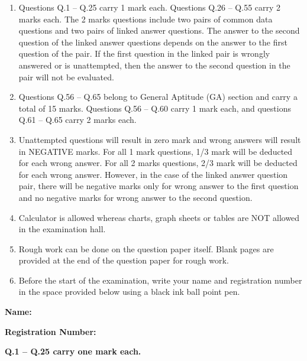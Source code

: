 \documentclass[journal,12pt,onecolumn]{IEEEtran}
\begin{document}
\begin{enumerate}
    \item Questions Q.1 -- Q.25 carry 1 mark each. Questions Q.26 -- Q.55 carry 2 marks each. The 2 marks questions include two pairs of common data questions and two pairs of linked answer questions. The answer to the second question of the linked answer questions depends on the answer to the first question of the pair. If the first question in the linked pair is wrongly answered or is unattempted, then the answer to the second question in the pair will not be evaluated.

    \item Questions Q.56 -- Q.65 belong to General Aptitude (GA) section and carry a total of 15 marks. Questions Q.56 -- Q.60 carry 1 mark each, and questions Q.61 -- Q.65 carry 2 marks each.

    \item Unattempted questions will result in zero mark and wrong answers will result in NEGATIVE marks. For all 1 mark questions, 1/3 mark will be deducted for each wrong answer. For all 2 marks questions, 2/3 mark will be deducted for each wrong answer. However, in the case of the linked answer question pair, there will be negative marks only for wrong answer to the first question and no negative marks for wrong answer to the second question.

    \item Calculator is allowed whereas charts, graph sheets or tables are NOT allowed in the examination hall.

    \item Rough work can be done on the question paper itself. Blank pages are provided at the end of the question paper for rough work.

    \item Before the start of the examination, write your name and registration number in the space provided below using a black ink ball point pen.
\end{enumerate}

\textbf{Name:} \underline{\hspace{6cm}}

\textbf{Registration Number:} \underline{\hspace{4cm}}

\newpage

\large\textbf{Q.1 -- Q.25 carry one mark each.}\\
\end{document}

